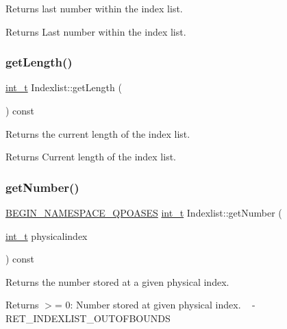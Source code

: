 Returns last number within the index list. \begin{DoxyReturn}{Returns}
Last number within the index list. 
\end{DoxyReturn}
\mbox{\label{class_indexlist_a2655f6990ec0500c482c1ca78ec853fa}} 
\subsubsection{\texorpdfstring{get\+Length()}{getLength()}}
{\footnotesize\ttfamily \hyperlink{_types_8hpp_ab6fd6105e64ed14a0c9281326f05e623}{int\+\_\+t} Indexlist\+::get\+Length (\begin{DoxyParamCaption}{ }\end{DoxyParamCaption}) const\hspace{0.3cm}{\ttfamily [inline]}}

Returns the current length of the index list. \begin{DoxyReturn}{Returns}
Current length of the index list. 
\end{DoxyReturn}
\mbox{\label{class_indexlist_a235bdb572a10884ec08b99be0fcc235a}} 
\subsubsection{\texorpdfstring{get\+Number()}{getNumber()}}
{\footnotesize\ttfamily \hyperlink{_types_8hpp_afd127fcb3c8f47975e9fa0ec2bacde52}{B\+E\+G\+I\+N\+\_\+\+N\+A\+M\+E\+S\+P\+A\+C\+E\+\_\+\+Q\+P\+O\+A\+S\+ES} \hyperlink{_types_8hpp_ab6fd6105e64ed14a0c9281326f05e623}{int\+\_\+t} Indexlist\+::get\+Number (\begin{DoxyParamCaption}\item[{\hyperlink{_types_8hpp_ab6fd6105e64ed14a0c9281326f05e623}{int\+\_\+t}}]{physicalindex }\end{DoxyParamCaption}) const\hspace{0.3cm}{\ttfamily [inline]}}

Returns the number stored at a given physical index. \begin{DoxyReturn}{Returns}
$>$= 0\+: Number stored at given physical index. ~\newline
 -\/\+R\+E\+T\+\_\+\+I\+N\+D\+E\+X\+L\+I\+S\+T\+\_\+\+O\+U\+T\+O\+F\+B\+O\+U\+N\+DS 
\end{DoxyReturn}

